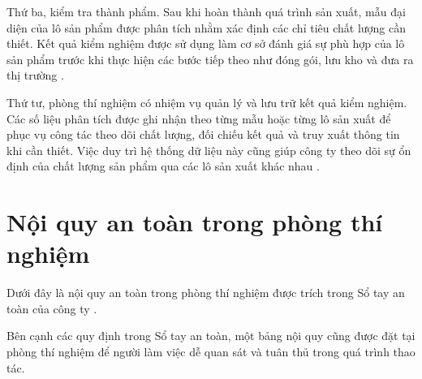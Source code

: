 Thứ ba, kiểm tra thành phẩm. 
Sau khi hoàn thành quá trình sản xuất, mẫu đại diện của lô sản phẩm được phân tích nhằm xác định các chỉ tiêu chất lượng cần thiết. 
Kết quả kiểm nghiệm được sử dụng làm cơ sở đánh giá sự phù hợp của lô sản phẩm trước khi thực hiện các bước tiếp theo như đóng gói, lưu kho và đưa ra thị trường \cite{company-internal-documents}.

Thứ tư, phòng thí nghiệm có nhiệm vụ quản lý và lưu trữ kết quả kiểm nghiệm. 
Các số liệu phân tích được ghi nhận theo từng mẫu hoặc từng lô sản xuất để phục vụ công tác theo dõi chất lượng, đối chiếu kết quả và truy xuất thông tin khi cần thiết. 
Việc duy trì hệ thống dữ liệu này cũng giúp công ty theo dõi sự ổn định của chất lượng sản phẩm qua các lô sản xuất khác nhau \cite{company-internal-documents}.

\section{Nội quy an toàn trong phòng thí nghiệm}
Dưới đây là nội quy an toàn trong phòng thí nghiệm được trích trong Sổ tay an toàn của công ty \cite{company-internal-documents}.

Bên cạnh các quy định trong Sổ tay an toàn, một bảng nội quy cũng được đặt tại phòng thí nghiệm để người làm việc dễ quan sát và tuân thủ trong quá trình thao tác.



